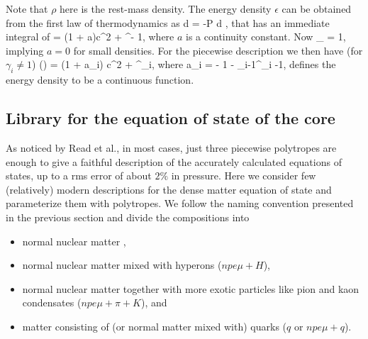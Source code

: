 Note that $\rho$ here is the rest-mass density.
The energy density $\epsilon$ can be obtained from the first law of thermodynamics as
\be
d  = -P d ,
\ee
that has an immediate integral of 
\be
\frac{\epsilon}{\rho} = (1 + a)c^2 +  \rho^{\gamma - 1},
\ee
where $a$ is a continuity constant. 
Now
\be
\lim_{\rho {}}  = 1,
\ee
implying $a=0$ for small densities.
For the piecewise description we then have (for $\gamma_i \ne 1$)
\be
\epsilon(\rho) = (1 + a_i) \rho c^2 +  \rho^{\gamma_i},
\ee
where
\be
a_i =  - 1 -   \rho_{i-1}^{\gamma_i -1},
\ee
defines the energy density to be a continuous function.

\subsection{Library for the equation of state of the core}

As noticed by Read et al.\cite{Read09}, in most cases, just three piecewise polytropes are enough to give a faithful description of the accurately calculated equations of states, up to a rms error of about $2\%$ in pressure.
Here we consider few (relatively) modern descriptions for the dense matter equation of state and parameterize them with polytropes.
We follow the naming convention presented in the previous section and divide the compositions into
\begin{itemize}
    \item normal nuclear matter \npem,
    \item normal nuclear matter mixed with hyperons ($npe\mu + H$),
    \item normal nuclear matter together with more exotic particles like pion and kaon condensates ($npe\mu + \pi + K$), and
    \item matter consisting of (or normal matter mixed with) quarks ($q$ or $npe\mu + q$).
\end{itemize}

